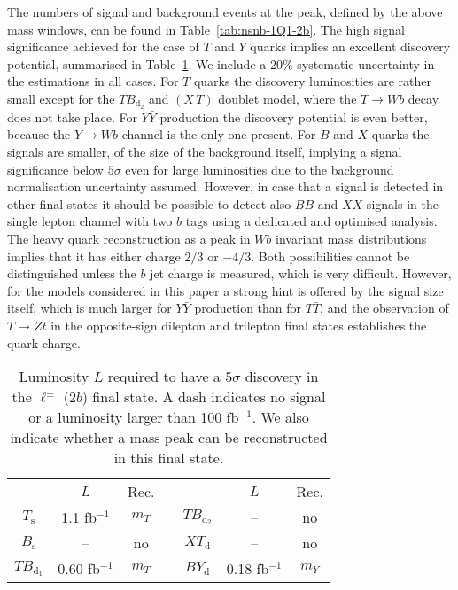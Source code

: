 \documentclass[12pt,a4paper]{article}
\newcommand{\fbin}{fb$^{-1}$}
\newcommand{\TT}{T \bar T}
\newcommand{\BB}{B \bar B}
\newcommand{\XX}{X \bar X}
\newcommand{\YY}{Y \bar Y}
\newcommand{\Ts}{T_\text{s}}
\newcommand{\Bs}{B_\text{s}}
\newcommand{\TBd}{TB_{\text{d}_1}}
\newcommand{\TBD}{TB_{\text{d}_2}}
\newcommand{\XTd}{XT_\text{d}}
\newcommand{\BYd}{BY_\text{d}}
\newcommand{\XT}{(X \, T)}
\begin{document}
The numbers of signal and background events at the peak, defined by the above mass windows, can be found in Table~\ref{tab:nsnb-1Q1-2b}. The high signal significance achieved for the case of $T$ and $Y$ quarks implies an excellent discovery potential, summarised in Table~\ref{tab:sig-1Q1-2b}.
We include a 20\% systematic uncertainty in the estimations in all cases. For $T$ quarks the discovery luminosities are rather small except for the $\TBD$ and $\XT$ doublet model, where the $T \to Wb$ decay does not take place. For $\YY$ production the discovery potential is even better, because the $Y \to Wb$ channel is the only one present.
For $B$ and $X$ quarks the signals are smaller, 
of the size of the background itself,
implying a signal significance below $5\sigma$ even for large luminosities due to the background normalisation uncertainty assumed. However, in case that a signal is detected in other final states it should be possible to detect also $\BB$ and $\XX$ signals in the single lepton channel with two $b$ tags using a dedicated and optimised analysis.
The heavy quark reconstruction as a peak in $Wb$ invariant mass distributions implies that it has either charge $2/3$ or $-4/3$. Both possibilities cannot be distinguished unless the $b$ jet charge is measured, which is very difficult. However, for the models considered in this paper a strong hint is offered by the signal size itself, which is much larger for $\YY$ production than for $\TT$, and
the observation of $T \to Zt$ in the opposite-sign dilepton and trilepton final states establishes the quark charge.

\begin{table}[t]
\begin{center}
\begin{tabular}{ccccccc}
       & $L$      & Rec. & \quad &        & $L$       & Rec. \\[1mm]
$\Ts$  & 1.1 \fbin  & $m_T$   &       & $\TBD$ & -- & no \\
$\Bs$  & -- & no   &       & $\XTd$ & -- & no \\
$\TBd$ & 0.60 \fbin & $m_T$   &       & $\BYd$ & 0.18 \fbin        & $m_Y$
\end{tabular}
\end{center}
\caption{Luminosity $L$ required to have a $5\sigma$ discovery in the $\ell^\pm$ ($2b$) final state. A dash indicates no signal or a luminosity larger than 100 \fbin.
We also indicate whether a mass peak can be reconstructed in this final state.}
\label{tab:sig-1Q1-2b}
\end{table}
\end{document}
